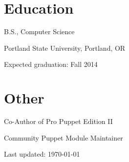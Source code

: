\documentclass[10pt,letterpaper]{article}
\renewenvironment{itemize}{
  \begin{list}{}{
    \setlength{\leftmargin}{1.5em}
    \setlength{\itemsep}{0.25em}
    \setlength{\parskip}{0pt}
    \setlength{\parsep}{0.25em}
  }
}{
  \end{list}
}
\begin{document}
\begin{minipage}[t]{0.5\textwidth}
\section*{Education}
\begin{itemize}

  \item B.S., Computer Science
  \item Portland State University, Portland, OR
  \item Expected graduation: Fall 2014
  
\end{itemize}
\end{minipage}
\begin{minipage}[t]{0.5\textwidth}
\section*{Other}
\begin{itemize}
\item Co-Author of Pro Puppet Edition II
\item Community Puppet Module Maintainer
\end{itemize}
\end{minipage}

\renewenvironment{itemize}{
  \begin{list}{$\bullet$}{
    \setlength{\leftmargin}{1.5em}
    \setlength{\itemsep}{0.25em}
    \setlength{\parskip}{0pt}
    \setlength{\parsep}{0.25em}
  }
}{
  \end{list}
}


\bigskip

\begin{center}
  \begin{small}
    Last updated: \today
  \end{small}
\end{center}
\end{document}

